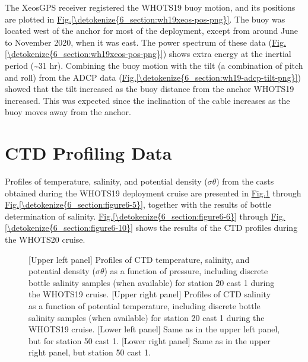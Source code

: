 \documentclass[a4paper,10pt,english,openany,oneside]{sphinxmanual}
\let\sphinxpxdimen\pdfpxdimen\else\newdimen\sphinxpxdimen
\begin{document}
\sphinxAtStartPar
The Xeos\sphinxhyphen{}GPS receiver registered the WHOTS\sphinxhyphen{}19 buoy motion, and its positions
are plotted in \hyperref[\detokenize{6_section:wh19xeos-pos-png}]{Fig.\@ \ref{\detokenize{6_section:wh19xeos-pos-png}}}. The buoy was located west of the
anchor for most of the deployment, except from around June to November 2020,
when it was east. The power spectrum of these data (\hyperref[\detokenize{6_section:wh19xeos-pos-png}]{Fig.\@ \ref{\detokenize{6_section:wh19xeos-pos-png}}})
shows extra energy at the inertial period (\textasciitilde{}31 hr). Combining the buoy motion
with the tilt (a combination of pitch and roll) from the ADCP data
(\hyperref[\detokenize{6_section:wh19-adcp-tilt-png}]{Fig.\@ \ref{\detokenize{6_section:wh19-adcp-tilt-png}}}) showed that the tilt increased as the buoy
distance from the anchor WHOTS\sphinxhyphen{}19 increased. This was expected since the
inclination of the cable increases as the buoy moves away from the anchor.


\section{CTD Profiling Data}
\label{\detokenize{6_section:ctd-profiling-data}}
\sphinxAtStartPar
Profiles of temperature, salinity, and potential density (\(\sigma\theta\))
from the casts obtained during the WHOTS\sphinxhyphen{}19 deployment cruise are presented in
\hyperref[\detokenize{6_section:figure6-1}]{Fig.\@ \ref{\detokenize{6_section:figure6-1}}} through \hyperref[\detokenize{6_section:figure6-5}]{Fig.\@ \ref{\detokenize{6_section:figure6-5}}}, together with the results of
bottle determination of salinity. \hyperref[\detokenize{6_section:figure6-6}]{Fig.\@ \ref{\detokenize{6_section:figure6-6}}} through
\hyperref[\detokenize{6_section:figure6-10}]{Fig.\@ \ref{\detokenize{6_section:figure6-10}}} shows the results of the CTD profiles during the WHOTS\sphinxhyphen{}20
cruise.

\begin{figure}[htbp]
\centering
\capstart

\noindent\sphinxincludegraphics[height=800\sphinxpxdimen]{{figures/ctd/1.whots_19/s20c1_s50c1}.png}
\caption{{[}Upper left panel{]} Profiles of CTD temperature, salinity, and potential
density (\(\sigma\theta\)) as a function of pressure, including discrete
bottle salinity samples (when available) for station 20 cast 1 during the
WHOTS\sphinxhyphen{}19 cruise. {[}Upper right panel{]} Profiles of CTD salinity as a function
of potential temperature, including discrete bottle salinity samples (when
available) for station 20 cast 1 during the WHOTS\sphinxhyphen{}19 cruise. {[}Lower left
panel{]} Same as in the upper left panel, but for station 50 cast 1. {[}Lower
right panel{]} Same as in the upper right panel, but station 50 cast 1.}\label{\detokenize{6_section:figure6-1}}\end{figure}
\end{document}
